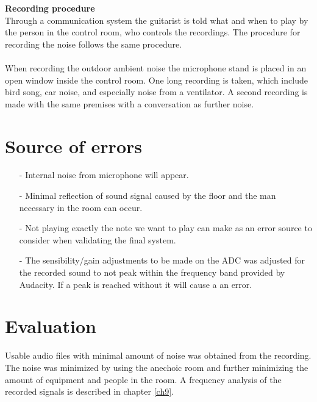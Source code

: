 \textbf{Recording procedure}\\
Through a communication system the guitarist is told what and when to play by the person in the control room, who controls the recordings.
The procedure for recording the noise follows the same procedure.\\
\\
When recording the outdoor ambient noise the microphone stand is placed in an open window inside the control room. One long recording is taken, which include bird song, car noise, and especially noise from a ventilator. A second recording is made with the same premises with a conversation as further noise.

\section{Source of errors}
\begin{itemize}
\item[-] Internal noise from microphone will appear. 
\item[-] Minimal reflection of sound signal caused by the floor and the man necessary in the room can occur. 
\item[-] Not playing exactly the note we want to play can make as an error source to consider when validating the final system.
\item[-] The sensibility/gain adjustments to be made on the ADC was adjusted for the recorded sound to not peak within the frequency band provided by Audacity. If a peak is reached without it will cause a an error.            
\end{itemize}

\section{Evaluation}
Usable audio files with minimal amount of noise was obtained from the recording. The noise was minimized by using the anechoic room and further minimizing the amount of equipment and  people in the room.       
A frequency analysis of the recorded signals is described in chapter \ref{ch9}.  

